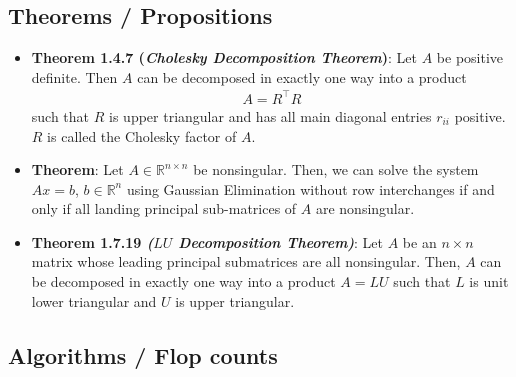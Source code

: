 \documentclass{report}
\begin{document}
    \bigbreak \noindent 
    \subsection{Theorems / Propositions}
    \begin{itemize}
                \item \textbf{Theorem 1.4.7 (\textit{Cholesky Decomposition Theorem})}: Let $A$ be positive definite. Then $A$ can be decomposed in exactly one way into a product
            \begin{align*}
                A = R^{\top}R
            \end{align*}
            such that $R$ is upper triangular and has all main diagonal entries $r_{ii}$ positive. $R$ is called the Cholesky factor of $A$.
        \item \textbf{Theorem}: Let $A \in \mathbb{R}^{n\times n}$ be nonsingular. Then, we can solve the system $Ax = b$, $b \in \mathbb{R}^{n}$ using Gaussian Elimination without row interchanges if and only if all landing principal sub-matrices of $A$ are nonsingular.
        \item \textbf{Theorem 1.7.19 \textit{($LU$ Decomposition Theorem)}}: Let $A$ be an $n\times n$ matrix whose leading principal submatrices are all nonsingular. Then, $A$ can be decomposed in exactly one way into a product $A = LU$ such that $L$ is unit lower triangular and $U$ is upper triangular.
      
    \end{itemize}

    \bigbreak \noindent 
    \subsection{Algorithms / Flop counts}
    \begin{itemize}
        
    \end{itemize}


    \pagebreak 
\end{document}

